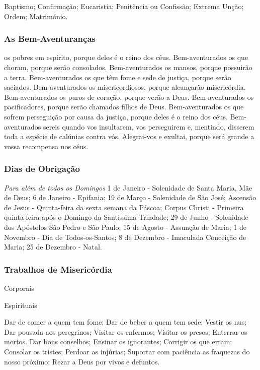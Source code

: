 Baptismo; Confirmação; Eucaristia; Penitência ou Confissão; Extrema Unção; Ordem; Matrimónio.

\subsubsection{As Bem-Aventuranças}

 os pobres em espírito, porque deles é o reino dos céus. Bem-aventurados os que choram, porque serão consolados. Bem-aventurados os mansos, porque possuirão a terra. Bem-aventurados os que têm fome e sede de justiça, porque serão saciados. Bem-aventurados os misericordiosos, porque alcançarão misericórdia. Bem-aventurados os puros de coração, porque verão a Deus. Bem-aventurados os pacificadores, porque serão chamados filhos de Deus. Bem-aventurados os que sofrem perseguição por causa da justiça, porque deles é o reino dos céus. Bem-aventurados sereis quando vos insultarem, vos perseguirem e, mentindo, disserem toda a espécie de calúnias contra vós. Alegrai-vos e exultai, porque será grande a vossa recompensa nos céus.

\subsubsection{Dias de Obrigação}

\emph{Para além de todos os Domingos}
1 de Janeiro - Solenidade de Santa Maria, Mãe de Deus;
6 de Janeiro - Epifania;
19 de Março - Solenidade de São José;
Ascensão de Jesus - Quinta-feira da sexta semana da Páscoa;
Corpus Christi - Primeira quinta-feira após o Domingo da Santíssima Trindade;
29 de Junho - Solenidade dos Apóstolos São Pedro e São Paulo; 15 de Agosto - Assunção de Maria;
1 de Novembro - Dia de Todos-os-Santos;
8 de Dezembro - Imaculada Conceição de Maria;
25 de Dezembro - Natal.

\subsubsection{Trabalhos de Misericórdia}

\begin{paracol}{2}
\begin{nscenter}{\redx Corporais}\end{nscenter}
\switchcolumn
\begin{nscenter}{\redx Espirituais}\end{nscenter}
\switchcolumn*
Dar de comer a quem tem fome; Dar de beber a quem tem sede; Vestir os nus; Dar pousada aos peregrinos; Visitar os enfermos; Visitar os presos; Enterrar os mortos.
\switchcolumn
Dar bons conselhos; Ensinar os ignorantes; Corrigir os que erram; Consolar os tristes; Perdoar as injúrias; Suportar com paciência as fraquezas do nosso próximo; Rezar a Deus por vivos e defuntos.
\end{paracol}

